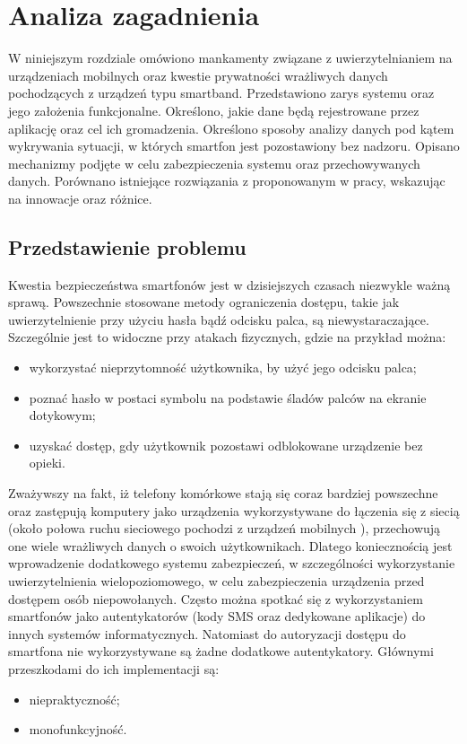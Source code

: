 \chapter{Analiza zagadnienia}
\thispagestyle{chapterBeginStyle}
\label{rozdzial1}
W niniejszym rozdziale omówiono mankamenty związane z uwierzytelnianiem na urządzeniach mobilnych oraz kwestie prywatności wrażliwych danych
pochodzących z urządzeń typu smartband. Przedstawiono zarys systemu oraz jego założenia funkcjonalne. Określono, jakie dane będą rejestrowane
przez aplikację oraz cel ich gromadzenia. Określono sposoby analizy danych pod kątem wykrywania sytuacji, w których smartfon jest pozostawiony
bez nadzoru. Opisano mechanizmy podjęte w celu zabezpieczenia systemu oraz przechowywanych danych. Porównano istniejące rozwiązania z proponowanym w pracy,
wskazując na innowacje oraz różnice.

\section{Przedstawienie problemu}
Kwestia bezpieczeństwa smartfonów jest w dzisiejszych czasach niezwykle ważną sprawą. Powszechnie stosowane metody ograniczenia dostępu, takie
jak uwierzytelnienie przy użyciu hasła bądź odcisku palca, są niewystaraczające. Szczególnie jest to widoczne przy atakach fizycznych, gdzie na
przykład można:
\begin{itemize}
    \item wykorzystać nieprzytomność użytkownika, by użyć jego odcisku palca;
    \item poznać hasło w postaci symbolu na podstawie śladów palców na ekranie dotykowym;
    \item uzyskać dostęp, gdy użytkownik pozostawi odblokowane urządzenie bez opieki.
\end{itemize}

\indent Zważywszy na fakt, iż telefony komórkowe stają się coraz bardziej powszechne\cite{Smartphone-Users-W-wide} oraz zastępują komputery jako urządzenia wykorzystywane do łączenia się z
siecią (około połowa ruchu sieciowego pochodzi z urządzeń mobilnych \cite{Share-Of-Internet-Traffic-Mobile}), przechowują one wiele wrażliwych danych
o swoich użytkownikach. Dlatego koniecznością jest wprowadzenie dodatkowego systemu zabezpieczeń, w
szczególności wykorzystanie uwierzytelnienia wielopoziomowego, w celu zabezpieczenia urządzenia przed dostępem osób niepowołanych. Często można
spotkać się z wykorzystaniem smartfonów jako autentykatorów (kody SMS oraz dedykowane aplikacje) do innych systemów informatycznych.
Natomiast do autoryzacji dostępu do smartfona nie wykorzystywane są żadne dodatkowe autentykatory. Głównymi przeszkodami do ich implementacji są:
\begin{itemize}
    \item niepraktyczność;
    \item monofunkcyjność.
\end{itemize}

